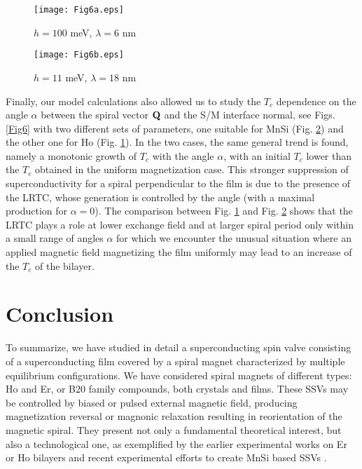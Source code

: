 \documentclass[prb,amsmath,amssymb,reprint]{revtex4-2}
\begin{document}
\begin{figure*}[htb]
\begin{subfigure}{.5\textwidth}
  \texttt{[image: Fig6a.eps]}
  \caption{$h=100$ meV, $\lambda=6$ nm}
  \label{Fig6a}
\end{subfigure}%
\begin{subfigure}{.5\textwidth}
  \texttt{[image: Fig6b.eps]}
  \caption{$h=11$ meV, $\lambda=18$ nm}
  \label{Fig6b}
\end{subfigure}
\caption{
Superconducting critical temperature $T_c$ as a
function of the angle $\alpha$ between the spiral vector $Q$ and the S layer normal
within three different magnetic configurations, (a) for large exchange $h=100$ meV and short spiral spatial period $\lambda=6$ nm, and (b) for small exchange $h=11$ meV and long spiral spatial period $\lambda=18$ nm (as in MnSi). We have taken equal layers thicknesses $d_s=d_f=21$ nm. The curves in the uniform and parallel cases are kept here as reference lines.
}
\label{Fig6}
\end{figure*}


Finally, our model calculations also allowed us to study the $T_c$ dependence on the angle $\alpha$ between the spiral vector ${\bf Q}$ and the S/M interface normal, see Figs. \ref{Fig6} with two different sets of parameters, one suitable for MnSi (Fig. \ref{Fig6b}) and the other one for Ho (Fig. \ref{Fig6a}). In the two cases, the same general trend is found, namely a monotonic growth of $T_c$ with the angle $\alpha$, with an initial $T_c$ lower than the $T_c$ obtained in the uniform magnetization case. This stronger suppression of superconductivity for a spiral perpendicular to the film is due to the presence of the LRTC, whose generation is controlled  by the angle (with a maximal production for $\alpha=0$). The comparison between Fig. \ref{Fig6a} and Fig. \ref{Fig6b} shows that the LRTC plays a role at lower exchange field and at larger spiral period only within a small range of angles $\alpha$ for  which we encounter the unusual situation where an applied magnetic field magnetizing the film uniformly may lead to an increase of the $T_c$ of the bilayer.




\section{Conclusion}

\label{Conclusion}

To summarize, we have studied in detail a superconducting spin valve consisting of a superconducting film covered by a spiral magnet characterized by multiple equilibrium configurations. We have considered spiral magnets of different types: Ho and Er, or B20 family compounds, both crystals and films. These SSVs may be controlled by
biased or pulsed external magnetic field, producing magnetization reversal or magnonic relaxation resulting in
reorientation of the  magnetic spiral. They present not only a fundamental theoretical interest, but also a technological one, as exemplified by the earlier experimental works \cite{DiBernardo2015,Satchell2017} on Er or Ho bilayers and recent experimental efforts to create MnSi based SSVs \cite{Grefe}.
\end{document}
